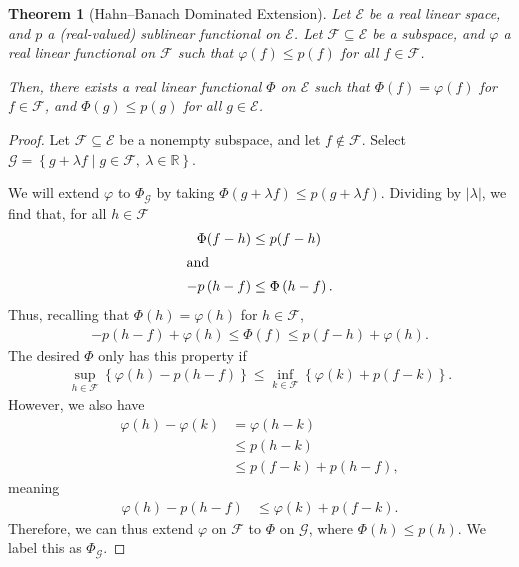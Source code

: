 \documentclass[10pt]{extarticle}
\newcommand{\R}{\mathbb{R}}
\newcommand{\set}[1]{\left\{#1\right\}}
\theoremstyle{plain}
\newtheorem*{theorem}{Theorem}
\theoremstyle{definition}
\theoremstyle{note}
\renewcommand{\newline}{\hfill\break}
\begin{document}
\begin{theorem}[Hahn--Banach Dominated Extension]
  Let $\mathcal{E}$ be a real linear space, and $p$ a (real-valued) sublinear functional on $\mathcal{E}$. Let $\mathcal{F}\subseteq \mathcal{E}$ be a subspace, and $\varphi$ a real linear functional on $\mathcal{F}$ such that $\varphi(f) \leq p(f)$ for all $f\in \mathcal{F}$.\newline

  Then, there exists a real linear functional $\Phi$ on $\mathcal{E}$ such that $\Phi(f) = \varphi(f)$ for $f\in \mathcal{F}$, and $\Phi(g) \leq p(g)$ for all $g\in \mathcal{E}$.
\end{theorem}
\begin{proof}
  Let $\mathcal{F}\subseteq \mathcal{E}$ be a nonempty subspace, and let $f\notin \mathcal{F}$. Select $\mathcal{G} = \set{g + \lambda f\mid g\in \mathcal{F},~\lambda \in \R}$.\newline

  We will extend $\varphi$ to $\Phi_{\mathcal{G}}$ by taking $\Phi(g + \lambda f)\leq p(g + \lambda f)$. Dividing by $|\lambda|$, we find that, for all $h\in \mathcal{F}$
  \begin{align*}
    \Phi(f - h) &\leq p(f - h)\\
    \intertext{and}
    -p\left(h - f\right)&\leq \Phi\left(h - f\right).
  \end{align*}
  Thus, recalling that $\Phi(h) = \varphi(h)$ for $h\in \mathcal{F}$,
  \begin{align*}
    -p\left(h-f\right) + \varphi(h) \leq \Phi\left(f\right) \leq p(f-h) + \varphi(h).
  \end{align*}
  The desired $\Phi$ only has this property if
  \begin{align*}
    \sup_{h\in \mathcal{F}}\set{\varphi(h) - p(h-f)} \leq \inf_{k\in \mathcal{F}}\set{\varphi(k) + p(f-k)}.
  \end{align*}
  However, we also have
  \begin{align*}
    \varphi(h)- \varphi(k) &= \varphi(h-k)\\
                           &\leq p(h-k)\\
                           &\leq p(f-k) + p(h-f),
  \end{align*}
  meaning
  \begin{align*}
    \varphi(h) - p(h-f) &\leq \varphi(k) + p(f-k).
  \end{align*}
  Therefore, we can thus extend $\varphi$ on $\mathcal{F}$ to $\Phi$ on $\mathcal{G}$, where $\Phi(h) \leq p(h)$. We label this as $\Phi_{\mathcal{G}}$.\newline


\end{proof}
\end{document}
